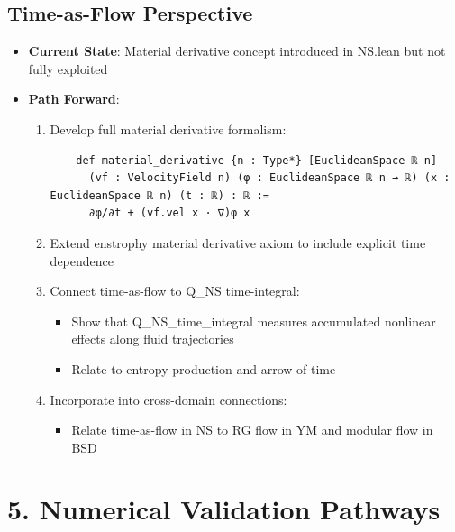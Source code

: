 \documentclass[11pt]{article}
\begin{document}
\subsection{Time-as-Flow Perspective}
\begin{itemize}
\item \textbf{Current State}: Material derivative concept introduced in NS.lean but not fully exploited
\item \textbf{Path Forward}:
  \begin{enumerate}
  \item Develop full material derivative formalism:
    \begin{verbatim}
    def material_derivative {n : Type*} [EuclideanSpace ℝ n]
      (vf : VelocityField n) (φ : EuclideanSpace ℝ n → ℝ) (x : EuclideanSpace ℝ n) (t : ℝ) : ℝ :=
      ∂φ/∂t + (vf.vel x · ∇)φ x
    \end{verbatim}
  \item Extend enstrophy material derivative axiom to include explicit time dependence
  \item Connect time-as-flow to Q\_NS time-integral:
    \begin{itemize}
    \item Show that Q\_NS\_time\_integral measures accumulated nonlinear effects along fluid trajectories
    \item Relate to entropy production and arrow of time
    \end{itemize}
  \item Incorporate into cross-domain connections:
    \begin{itemize}
    \item Relate time-as-flow in NS to RG flow in YM and modular flow in BSD
    \end{itemize}
  \end{enumerate}
\end{itemize}

\section{5. Numerical Validation Pathways}
\end{document}
